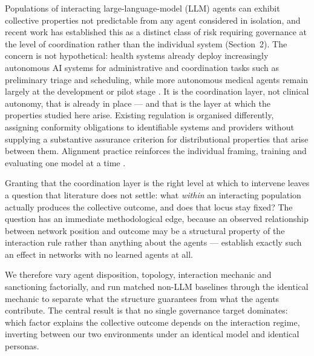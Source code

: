 \documentclass[11pt,a4paper]{article}
\begin{document}
Populations of interacting large-language-model (LLM) agents can
exhibit collective properties not predictable from any agent
considered in isolation, and recent work has established this as a
distinct class of risk requiring governance at the level of
coordination rather than the individual system (Section~2). The
concern is not hypothetical: health systems already deploy
increasingly autonomous AI systems for administrative and coordination
tasks such as preliminary triage and scheduling, while more autonomous
medical agents remain largely at the development or pilot stage
\citep{Athni:2026:Health}. It is the coordination layer, not clinical
autonomy, that is already in place --- and that is the layer at which
the properties studied here arise. Existing regulation is organised differently,
assigning conformity obligations to identifiable systems and providers
\citep{EuropeanUnion:2024:AIAct} without supplying a substantive assurance criterion
for distributional properties that arise between them. Alignment practice
reinforces the individual framing, training and evaluating one model
at a time \citep{Ouyang:2022:Instructions,Bai:2022:Constitutional}.

Granting that the coordination layer is the right level at which to
intervene leaves a question that literature does not settle: what
\emph{within} an interacting population actually produces the
collective outcome, and does that locus stay fixed? The question has
an immediate methodological edge, because an observed relationship
between network position and outcome may be a structural property of
the interaction rule rather than anything about the agents ---
\citet{Sheng:2026:Equality} establish exactly such an effect in networks with no
learned agents at all.

We therefore vary agent disposition, topology, interaction mechanic
and sanctioning factorially, and run matched non-LLM baselines through
the identical mechanic to separate what the structure guarantees from
what the agents contribute. The central result is that no single
governance target dominates: which factor explains the collective
outcome depends on the interaction regime, inverting between our two
environments under an identical model and identical personas.
\end{document}
